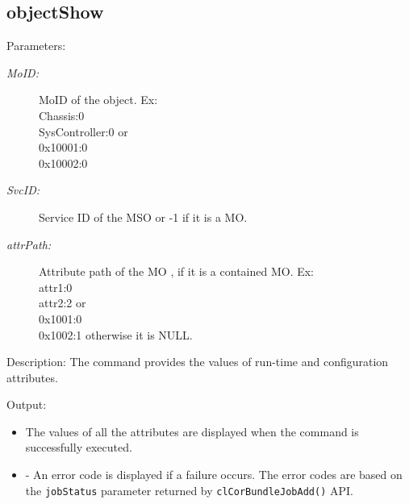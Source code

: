 \begin{flushleft}
\section{objectShow}
\begin{Desc}
\item
[Parameters:] 
\begin{description}
\item[{\em Mo\-ID:}] MoID of the object. { Ex: \\Chassis:0\\SysController:0 or \\0x10001:0\\0x10002:0 }
\item[{\em Svc\-ID:}] Service ID of the MSO or -1 if it is a MO.
\item[{\em attr\-Path:}] Attribute path of the MO , if it is a contained MO. Ex: 
	\\attr1:0\\attr2:2 or \\0x1001:0\\0x1002:1 otherwise it is NULL.
\end{description}
\end{Desc}
\begin{Desc}
\item
[Description:]
The command provides the values of run-time and configuration attributes.
\end{Desc}
\begin{Desc}
\item
[Output:]
\begin{itemize}
\item The values of all the attributes are displayed when the command is successfully executed.
\item -	An error code is displayed if a failure occurs. The error codes are based on the {\tt{jobStatus}} parameter returned by {\tt{clCorBundleJobAdd()}}
API.
\end{itemize}
\end{Desc}





\end{flushleft}
